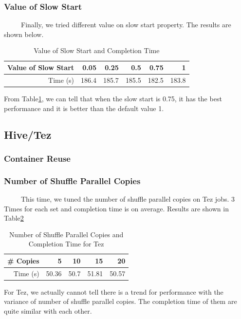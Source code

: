 \documentclass[10pt]{article}
\begin{document}
\subsubsection{Value of Slow Start}
~~~~~Finally, we tried different value on slow start property. The results are shown below.
\begin{table}[htbp]
  \centering
  \caption{Value of Slow Start and Completion Time}
    \begin{tabular}{rrrrrr}
    \toprule
    Value of Slow Start & 0.05  & 0.25  & 0.5   & 0.75  & 1 \\
    \midrule
    Time (s) & 186.4 & 185.7 & 185.5 & 182.5 & 183.8 \\
    \bottomrule
    \end{tabular}%
  \label{tab:val_of_slow}%
\end{table}%

From Table\ref{tab:val_of_slow}, we can tell that when the slow start is 0.75, it has the best performance and it is better than the default value 1.
 

\subsection{Hive/Tez}
\subsubsection{Container Reuse}
\subsubsection{Number of Shuffle Parallel Copies}

~~~~~This time, we tuned the number of shuffle parallel copies on Tez jobs. 3 Times for each set and completion time is on average. Results are shown in Table\ref{tab:num_shuffle_parallel_tez}

\begin{table}[htbp]
  \centering
  \caption{Number of Shuffle Parallel Copies and Completion Time for Tez}
    \begin{tabular}{rrrrr}
    \toprule
    \# Copies & 5     & 10    & 15    & 20 \\
    \midrule
    Time (s) & 50.36 & 50.7  & 51.81 & 50.57 \\
    \bottomrule
    \end{tabular}%
  \label{tab:num_shuffle_parallel_tez}%
\end{table}%

For Tez, we actually cannot tell there is a trend for performance with the variance of number of shuffle parallel copies. The completion time of them are quite similar with each other. 
\end{document}
